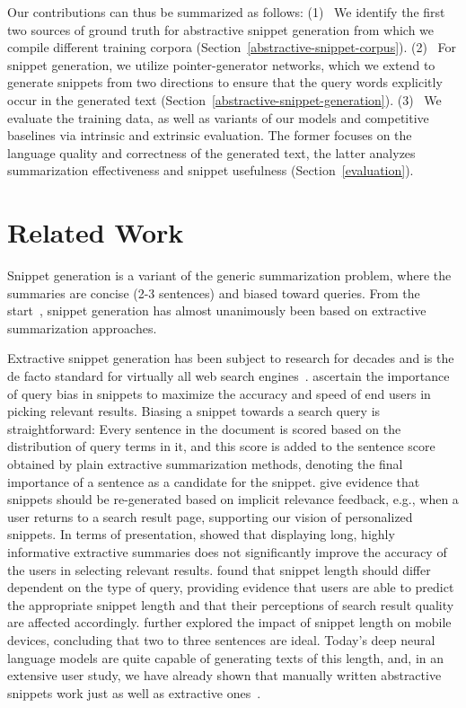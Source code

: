 \documentclass[sigconf]{acmart}
\newcommand{\Ni}{(1)~}
\newcommand{\Nii}{(2)~}
\newcommand{\Niii}{(3)~}
\begin{document}
Our contributions can thus be summarized as follows:
\Ni
We identify the first two sources of ground truth for abstractive snippet generation from which we compile different training corpora (Section~\ref{abstractive-snippet-corpus}).
\Nii
For snippet generation, we utilize pointer-generator networks, which we extend to generate snippets from two directions to ensure that the query words explicitly occur in the generated text (Section~\ref{abstractive-snippet-generation}).
\Niii
We evaluate the training data, as well as variants of our models and competitive baselines via intrinsic and extrinsic evaluation.
The former focuses on the language quality and correctness of the generated text, the latter analyzes summarization effectiveness and snippet usefulness (Section~\ref{evaluation}).
 \section{Related Work}

Snippet generation is a variant of the generic summarization problem, where the summaries are concise (2-3 sentences) and biased toward queries. From the start~\cite{luhn:1958}, snippet generation has almost unanimously been based on extractive summarization approaches.

Extractive snippet generation has been subject to research for decades and is the de facto standard for virtually all web search engines~\cite{brin:98}. \citet{tombros:1998} ascertain the importance of query bias in snippets to maximize the accuracy and speed of end users in picking relevant results. Biasing a snippet towards a search query is straightforward: Every sentence in the document is scored based on the distribution of query terms in it, and this score is added to the sentence score obtained by plain extractive summarization methods, denoting the final importance of a sentence as a candidate for the snippet. \citet{white:2002a,white:2002b} give evidence that snippets should be re-generated based on implicit relevance feedback, e.g., when a user returns to a search result page, supporting our vision of personalized snippets. In terms of presentation, \citet{maxwell:17} showed that displaying long, highly informative extractive summaries does not significantly improve the accuracy of the users in selecting relevant results. \citet{kaisser:08} found that snippet length should differ dependent on the type of query, providing evidence that users are able to predict the appropriate snippet length and that their perceptions of search result quality are affected accordingly. \citet{kim:17} further explored the impact of snippet length on mobile devices, concluding that two to three sentences are ideal. Today's deep neural language models are quite capable of generating texts of this length, and, in an extensive user study, we have already shown that manually written abstractive snippets work just as well as extractive ones~\cite{stein:2018k}.
\end{document}
